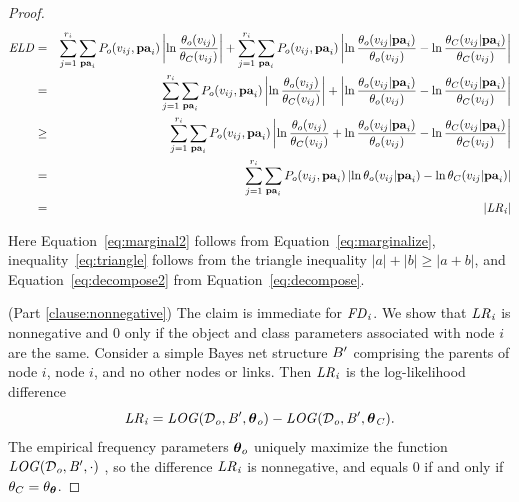 \begin{proof}
			\begin{eqnarray}
			\notag \it{ELD} & = & \sum_{j=1}^{r_{i}} \sum_{\mathbf{pa}_{i}} 
			P_{o}( v_{ij},\mathbf{pa}_{i}) \left|\ln \frac{\theta_{o}( v_{ij})}{\theta_{C}( v_{ij})} \right| + 
			\sum_{j=1}^{r_{i}} \sum_{\mathbf{pa}_{i}} 
			P_{o}( v_{ij},\mathbf{pa}_{i})
			\left| \ln \frac{\theta_{o}( v_{ij}|\mathbf{pa}_{i})}{\theta_{o}(v_{ij})} - \ln \frac{\theta_{C}( v_{ij}|\mathbf{pa}_{i})}{\theta_{C}(v_{ij})}\right|\\ 
			& = & \sum_{j=1}^{r_{i}} \sum_{\mathbf{pa}_{i}} 
			P_{o}( v_{ij},\mathbf{pa}_{i})
			\left|\ln \frac{\theta_{o}( v_{ij})}{\theta_{C}( v_{ij})}\right| +
			\left|\ln \frac{\theta_{o}( v_{ij}|\mathbf{pa}_{i})}{\theta_{o}(v_{ij})} - \ln \frac{\theta_{C}( v_{ij}|\mathbf{pa}_{i})}{\theta_{C}(v_{ij})} \right| \label{eq:marginal2} \\
			& \geq & \sum_{j=1}^{r_{i}} \sum_{\mathbf{pa}_{i}} 
			P_{o}( v_{ij},\mathbf{pa}_{i})
			\left|\ln \frac{\theta_{o}( v_{ij})}{\theta_{C}( v_{ij})} +
			\ln \frac{\theta_{o}( v_{ij}|\mathbf{pa}_{i})}{\theta_{o}(v_{ij})} - \ln \frac{\theta_{C}( v_{ij}|\mathbf{pa}_{i})}{\theta_{C}(v_{ij})} \right| \label{eq:triangle} \\
			& = & \sum_{j=1}^{r_{i}} \sum_{\mathbf{pa}_{i}} P_{o}( v_{ij},\mathbf{pa}_{i})\left| \ln \theta_{o}(  v_{ij}|\mathbf{pa}_{i})- \ln\theta_{C}( v_{ij}|\mathbf{pa}_{i}) \right| \label{eq:decompose2} \\
			& = &|\it{LR}_{i}|
			\end{eqnarray}
			
			Here Equation~\eqref{eq:marginal2} follows from Equation~\eqref{eq:marginalize}, inequality~\ref{eq:triangle} follows from the triangle inequality $|a|+|b|\geq |a+b|$, and Equation~\eqref{eq:decompose2} from Equation~\eqref{eq:decompose}.
			
			(Part \ref{clause:nonnegative}) The claim is immediate for $\it{FD}_{i}$. We show that $\it{LR}_{i}$ is nonnegative and 0 only if the object and class parameters associated with node $i$ are the same. 
			Consider a simple Bayes net structure $B'$ comprising the parents of node $i$, node $i$, and no other nodes or links. Then $\it{LR}_{i}$ is the log-likelihood difference $$ \it{LR}_{i} =\it{LOG}(\mathcal{D}_{o},B',\boldsymbol{\theta}_{o}) - \it{LOG}(\mathcal{D}_{o},B',\boldsymbol{\theta}_{C}).$$ The empirical frequency parameters $\boldsymbol{\theta}_{o}$ uniquely maximize the function $\it{LOG}(\mathcal{D}_{o},B',\cdot)$ \cite{Schulte2012}, so the difference $\it{LR}_{i}$ is nonnegative, and equals 0 if and only if $\theta_{C} = \theta_{\boldsymbol{\theta}}$.
		\end{proof}
		
